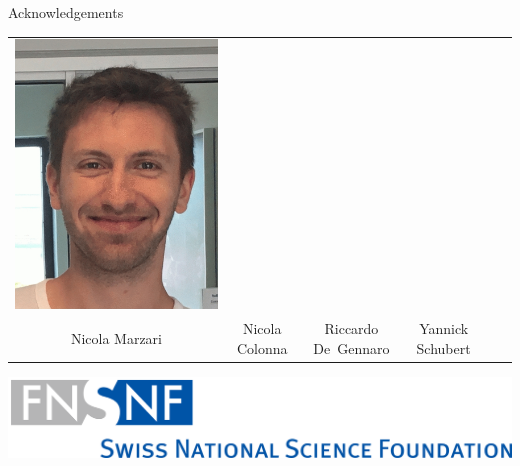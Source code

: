 \documentclass[xcolor=table,aspectratio=169]{beamer}
\numberwithin{equation}{section}
\begin{document}
\begin{frame}{Acknowledgements}
\begin{center}
\begin{tabularx}{\textwidth}{CCCCCC}
         \includegraphics[height = 0.2\paperheight]{figures/riccardo_degennaro.jpg} \\
         Nicola Marzari                                                           &
         Nicola Colonna                                                           &
         Riccardo De~Gennaro                                                      &
         Yannick Schubert                                                           \\
      \end{tabularx}
   \end{center}
   \begin{center}
      \includegraphics[height = 0.1\paperheight]{figures/fig_snsf_logo.png}

\end{center}
\end{frame}
\end{document}
